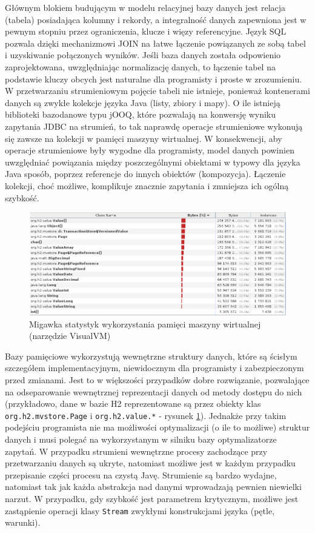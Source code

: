 \documentclass[12pt]{extarticle}
\begin{document}
    Głównym blokiem budującym w modelu relacyjnej bazy danych jest relacja (tabela) posiadająca kolumny i rekordy, a integralność danych zapewniona jest w pewnym stopniu przez ograniczenia, klucze i więzy referencyjne. Język SQL pozwala dzięki mechanizmowi JOIN na łatwe łączenie powiązanych ze sobą tabel i uzyskiwanie połączonych wyników. Jeśli baza danych została odpowienio zaprojektowana, uwzględniając normalizację danych, to łączenie tabel na podstawie kluczy obcych jest naturalne dla programisty i proste w zrozumieniu. W przetwarzaniu strumieniowym pojęcie tabeli nie istnieje, ponieważ kontenerami danych są zwykłe kolekcje języka Java (listy, zbiory i mapy). O ile istnieją biblioteki bazodanowe typu jOOQ, które pozwalają na konwersję wyniku zapytania JDBC na strumień, to tak naprawdę operacje strumieniowe wykonują się zawsze na kolekcji w pamięci maszyny wirtualnej. W konsekwencji, aby operacje strumieniowe były wygodne dla programisty, model danych powinien uwzględniać powiązania między poszczególnymi obiektami w typowy dla języka Java sposób, poprzez referencje do innych obiektów (kompozycja). Łączenie kolekcji, choć możliwe, komplikuje znacznie zapytania i zmniejsza ich ogólną szybkość.

\begin{figure}[H]
\centering
\includegraphics[width=12cm]{jvmmemory}
\caption{Migawka statystyk wykorzystania pamięci maszyny wirtualnej (narzędzie VisualVM)}
\label{fig:jvmmemory}
\end{figure}

    Bazy pamięciowe wykorzystują wewnętrzne struktury danych, które są ścisłym szczegółem implementacyjnym, niewidocznym dla programisty i zabezpieczonym przed zmianami. Jest to w większości przypadków dobre rozwiązanie, pozwalające na odseparowanie wewnętrznej reprezentacji danych od metody dostępu do nich (przykładowo, dane w bazie H2 reprezentowane są przez obiekty klas \texttt{org.h2.mvstore.Page} i \texttt{org.h2.value.*} - rysunek \ref{fig:jvmmemory}). Jednakże przy takim podejściu programista nie ma możliwości optymalizacji (o ile to możliwe) struktur danych i musi polegać na wykorzystanym w silniku bazy optymalizatorze zapytań. W przypadku strumieni wewnętrzne procesy zachodzące przy przetwarzaniu danych są ukryte, natomiast możliwe jest w każdym przypadku przepisanie części procesu na czystą Javę. Strumienie są bardzo wydajne, natomiast tak jak każda abstrakcja nad danymi wprowadzają pewnien niewielki narzut. W przypadku, gdy szybkość jest parametrem krytycznym, możliwe jest zastąpienie operacji klasy \texttt{Stream} zwykłymi konstrukcjami języka (pętle, warunki). 
\end{document}
